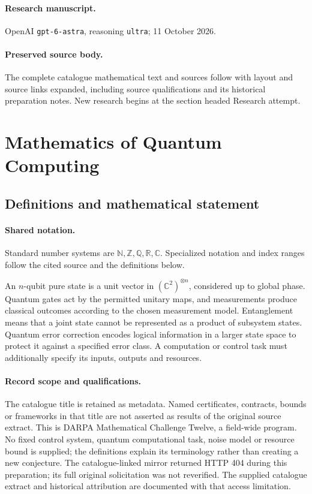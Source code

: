 \documentclass[11pt]{article}
\begin{document}
\paragraph{Research manuscript.} OpenAI \texttt{gpt-6-astra}, reasoning \texttt{ultra}; 11 October 2026.
\paragraph{Preserved source body.} The complete catalogue mathematical text and sources follow with layout and source links expanded, including source qualifications and its historical preparation notes. New research begins at the section headed Research attempt.

\section{Mathematics of Quantum Computing}\label{statement}

\subsection{Definitions and mathematical statement}

\paragraph{Shared notation.}Standard number systems are $\mathbb N,\mathbb Z,\mathbb Q,\mathbb R,\mathbb C$. Specialized notation and index ranges follow the cited source and the definitions below.


An $n$-qubit pure state is a unit vector in $(\mathbb C^2)^{\otimes n}$, considered up to global phase. Quantum gates act by the permitted unitary maps, and measurements produce classical outcomes according to the chosen measurement model. Entanglement means that a joint state cannot be represented as a product of subsystem states. Quantum error correction encodes logical information in a larger state space to protect it against a specified error class. A computation or control task must additionally specify its inputs, outputs and resources.
\paragraph{Record scope and qualifications.}
The catalogue title is retained as metadata. Named certificates, contracts, bounds or frameworks in that title are not asserted as results of the original source extract.
This is DARPA Mathematical Challenge Twelve, a field-wide program. No fixed control system, quantum computational task, noise model or resource bound is supplied; the definitions explain its terminology rather than creating a new conjecture. The catalogue-linked mirror returned HTTP 404 during this preparation; its full original solicitation was not reverified. The supplied catalogue extract and historical attribution are documented with that access limitation.
\end{document}
